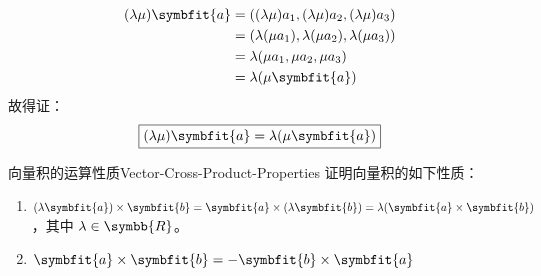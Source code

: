\begin{myproof}

    \begin{equation}
        \begin{aligned}
            (\lambda\mu)\symbfit{a} & = ((\lambda\mu)a_1, (\lambda\mu)a_2, (\lambda\mu)a_3)    \\
                                    & = (\lambda(\mu a_1), \lambda(\mu a_2), \lambda(\mu a_3)) \\
                                    & = \lambda(\mu a_1, \mu a_2, \mu a_3)                     \\
                                    & = \lambda(\mu\symbfit{a})
        \end{aligned}
    \end{equation}
    故得证：
    \begin{equation}
        \boxed{(\lambda\mu)\symbfit{a} = \lambda(\mu\symbfit{a})}
    \end{equation}
\end{myproof}


\begin{problem}{向量积的运算性质}{Vector-Cross-Product-Properties}
    证明向量积的如下性质：
    \begin{enumerate}
        \item $(\lambda\symbfit{a}) \times \symbfit{b} = \symbfit{a} \times (\lambda\symbfit{b}) = \lambda(\symbfit{a} \times \symbfit{b})$，其中 $\lambda \in \symbb{R}$。
        \item $\symbfit{a} \times \symbfit{b} = -\symbfit{b} \times \symbfit{a}$
    \end{enumerate}
\end{problem}

